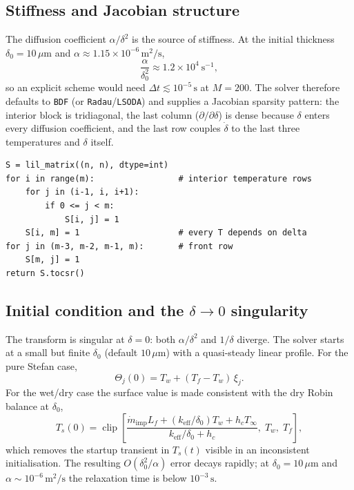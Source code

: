 \documentclass[11pt,a4paper]{article}
\newcommand{\Ts}{T_s}
\newcommand{\Tw}{T_w}
\newcommand{\Tinf}{T_\infty}
\newcommand{\Tf}{T_f}
\newcommand{\Lf}{L_f}
\newcommand{\keff}{k_{\mathrm{eff}}}
\newcommand{\mdot}{\dot m}
\begin{document}
\subsection{Stiffness and Jacobian structure}

The diffusion coefficient $\alpha/\delta^2$ is the source of stiffness. At the initial
thickness $\delta_0=10\,\mu\mathrm{m}$ and $\alpha\approx1.15\times10^{-6}\,\mathrm{m^2/s}$,
\begin{equation}
  \frac{\alpha}{\delta_0^2}\approx1.2\times10^{4}\ \mathrm{s^{-1}},
\end{equation}
so an explicit scheme would need $\Delta t\lesssim10^{-5}\,\mathrm{s}$ at $M=200$.
The solver therefore defaults to \texttt{BDF} (or \texttt{Radau}/\texttt{LSODA}) and
supplies a Jacobian sparsity pattern: the interior block is tridiagonal, the last column
($\partial/\partial\delta$) is dense because $\delta$ enters every diffusion coefficient,
and the last row couples $\dot\delta$ to the last three temperatures and $\delta$ itself.

\begin{lstlisting}[style=py,caption={Jacobian sparsity pattern supplied to \texttt{solve\_ivp}.},label={lst:jac}]
S = lil_matrix((n, n), dtype=int)
for i in range(m):                 # interior temperature rows
    for j in (i-1, i, i+1):
        if 0 <= j < m:
            S[i, j] = 1
    S[i, m] = 1                    # every T depends on delta
for j in (m-3, m-2, m-1, m):       # front row
    S[m, j] = 1
return S.tocsr()
\end{lstlisting}

\subsection{Initial condition and the $\delta\to0$ singularity}

The transform is singular at $\delta=0$: both $\alpha/\delta^2$ and $1/\delta$ diverge.
The solver starts at a small but finite $\delta_0$ (default $10\,\mu\mathrm{m}$) with a
quasi-steady linear profile. For the pure Stefan case,
\begin{equation}
  \Theta_j(0)=\Tw+(\Tf-\Tw)\,\xi_j .
\end{equation}
For the wet/dry case the surface value is made consistent with the dry Robin balance at
$\delta_0$,
\begin{equation}
  \Ts(0)=\operatorname{clip}\!\left[
    \frac{\mdot_{\mathrm{imp}}\Lf+(\keff/\delta_0)\Tw+h_c\Tinf}
         {\keff/\delta_0+h_c},\;\Tw,\;\Tf\right],
\end{equation}
which removes the startup transient in $\Ts(t)$ visible in an inconsistent initialisation.
The resulting $O(\delta_0^2/\alpha)$ error decays rapidly; at $\delta_0=10\,\mu\mathrm{m}$
and $\alpha\sim10^{-6}\,\mathrm{m^2/s}$ the relaxation time is below $10^{-3}\,\mathrm{s}$.
\end{document}
